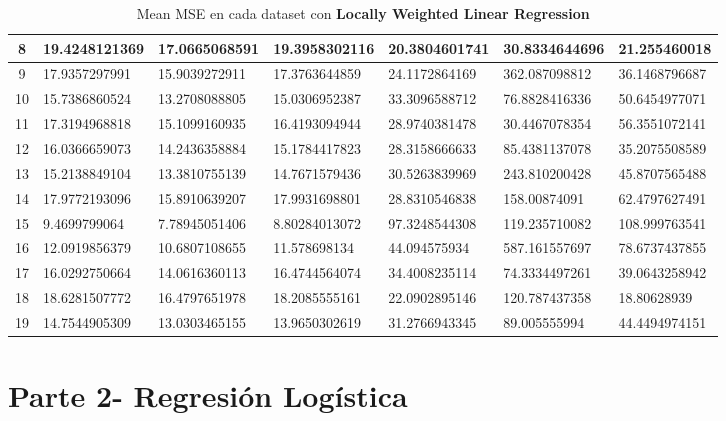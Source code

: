 \documentclass[spanish, fleqn]{article}
\begin{document}
\begin{enumerate}
\begin{table}[!htbp]
\begin{tabular}{|c|l|l|l|l|l|l|}
8  & 19.4248121369 & 17.0665068591 & 19.3958302116 & 20.3804601741 & 30.8334644696 & 21.255460018 \\ \hline
9  & 17.9357297991 & 15.9039272911 & 17.3763644859 & 24.1172864169 & 362.087098812 & 36.1468796687 \\ \hline
10 & 15.7386860524 & 13.2708088805 & 15.0306952387 & 33.3096588712 & 76.8828416336 & 50.6454977071 \\ \hline
11 & 17.3194968818 & 15.1099160935 & 16.4193094944 & 28.9740381478 & 30.4467078354 & 56.3551072141 \\ \hline
12 & 16.0366659073 & 14.2436358884 & 15.1784417823 & 28.3158666633 & 85.4381137078 & 35.2075508589 \\ \hline
13 & 15.2138849104 & 13.3810755139 & 14.7671579436 & 30.5263839969 & 243.810200428 & 45.8707565488 \\ \hline
14 & 17.9772193096 & 15.8910639207 & 17.9931698801 & 28.8310546838 & 158.00874091 & 62.4797627491 \\ \hline
15 & 9.4699799064 & 7.78945051406 & 8.80284013072 & 97.3248544308 & 119.235710082 & 108.999763541 \\ \hline
16 & 12.0919856379 & 10.6807108655 & 11.578698134 & 44.094575934 & 587.161557697 & 78.6737437855 \\ \hline
17 & 16.0292750664 & 14.0616360113 & 16.4744564074 & 34.4008235114 & 74.3334497261 & 39.0643258942 \\ \hline
18 & 18.6281507772 & 16.4797651978 & 18.2085555161 & 22.0902895146 & 120.787437358 & 18.80628939 \\ \hline
19 & 14.7544905309 & 13.0303465155 & 13.9650302619 & 31.2766943345 & 89.005555994 & 44.4494974151 \\ \hline
\end{tabular}
\caption{Mean MSE en cada dataset con \textbf{Locally Weighted Linear Regression}}
\label{my-label}
\end{table}





\end{enumerate}



\newpage
\section*{Parte 2- Regresión Logística}
\end{document}
